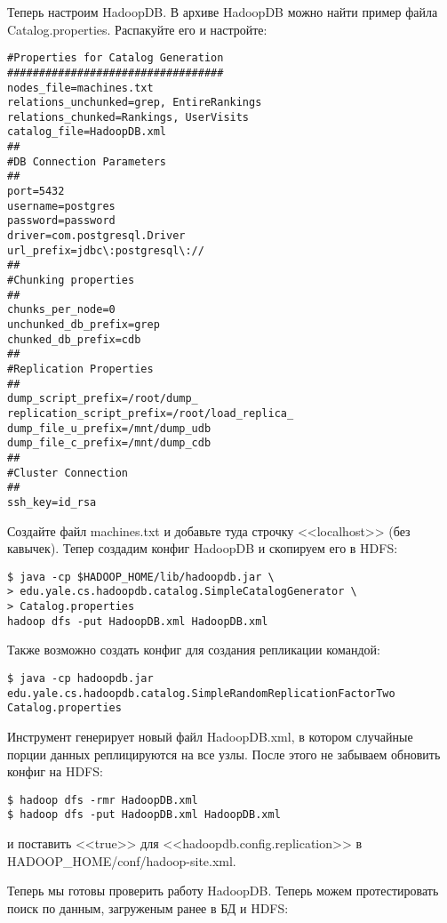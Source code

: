 Теперь настроим HadoopDB. В архиве HadoopDB можно найти пример файла Catalog.properties. Распакуйте его и настройте:

\begin{lstlisting}[label=lst:haddop22,caption=Тестирование]
#Properties for Catalog Generation
##################################
nodes_file=machines.txt
relations_unchunked=grep, EntireRankings
relations_chunked=Rankings, UserVisits
catalog_file=HadoopDB.xml
##
#DB Connection Parameters
##
port=5432
username=postgres
password=password
driver=com.postgresql.Driver
url_prefix=jdbc\:postgresql\://
##
#Chunking properties
##
chunks_per_node=0
unchunked_db_prefix=grep
chunked_db_prefix=cdb
##
#Replication Properties
##
dump_script_prefix=/root/dump_
replication_script_prefix=/root/load_replica_
dump_file_u_prefix=/mnt/dump_udb
dump_file_c_prefix=/mnt/dump_cdb
##
#Cluster Connection
##
ssh_key=id_rsa
\end{lstlisting}

Создайте файл machines.txt и добавьте туда строчку <<localhost>> (без кавычек). Тепер создадим конфиг HadoopDB и скопируем его в HDFS:

\begin{lstlisting}[label=lst:haddop23,caption=Тестирование]
$ java -cp $HADOOP_HOME/lib/hadoopdb.jar \
> edu.yale.cs.hadoopdb.catalog.SimpleCatalogGenerator \
> Catalog.properties
hadoop dfs -put HadoopDB.xml HadoopDB.xml
\end{lstlisting}

Также возможно создать конфиг для создания репликации командой:

\begin{lstlisting}[label=lst:haddop23:1,caption=Репликация]
$ java -cp hadoopdb.jar edu.yale.cs.hadoopdb.catalog.SimpleRandomReplicationFactorTwo Catalog.properties
\end{lstlisting}

Инструмент генерирует новый файл HadoopDB.xml, в котором случайные порции данных реплицируются на все узлы. После этого не забываем обновить конфиг на HDFS:

\begin{lstlisting}[label=lst:haddop23:2,caption=Обновляем конфиг]
$ hadoop dfs -rmr HadoopDB.xml
$ hadoop dfs -put HadoopDB.xml HadoopDB.xml
\end{lstlisting}

и поставить <<true>> для <<hadoopdb.config.replication>> в HADOOP\_HOME/conf/hadoop-site.xml.

Теперь мы готовы проверить работу HadoopDB. Теперь можем протестировать поиск по данным, загруженым ранее в БД и HDFS:

